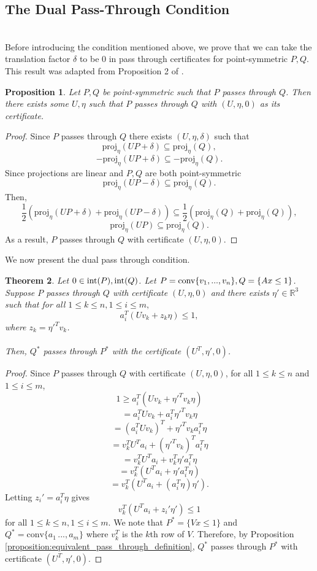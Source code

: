 \documentclass[a4paper]{amsart}
\newtheorem{thm}{Theorem}
\newtheorem{prop}[thm]{Proposition}
\theoremstyle{remark}
\begin{document}
\subsection{The Dual Pass-Through Condition} \label{subsec:dual_pass_through_condition}
\hfill \\
Before introducing the condition mentioned above, we prove that we can take the translation factor $\delta$ to be 0 in pass through certificates for point-symmetric $P,Q$. This result was adapted from Proposition 2 of \cite{StYu23}.

\begin{prop} \label{lem:translation_factor}
	Let $P,Q$ be point-symmetric such that $P$ passes through $Q$. Then there exists some $U, \eta$ such that $P$ passes through $Q$ with $(U, \eta, 0)$ as its certificate.
\end{prop}
\begin{proof}
	Since $P$ passes through $Q$ there exists $(U,\eta,\delta)$ such that
	$$\textrm{proj}_\eta(UP+\delta)\subseteq \textrm{proj}_\eta(Q),$$ 
	$$-\textrm{proj}_\eta (UP+\delta)\subseteq -\textrm{proj}_\eta(Q).$$ 
	Since projections are linear and $P,Q$ are both point-symmetric $$\textrm{proj}_\eta(UP-\delta)\subseteq \textrm{proj}_\eta(Q).$$
	Then, $$\frac{1}{2}\left(\textrm{proj}_\eta(UP+\delta)+\textrm{proj}_\eta(UP-\delta)\right)\subseteq\frac{1}{2}\left(\textrm{proj}_\eta(Q)+\textrm{proj}_\eta(Q)\right),$$$$\textrm{proj}_\eta(UP)\subseteq \textrm{proj}_\eta(Q).$$
	As a result, $P$ passes through $Q$ with certificate $(U, \eta, 0)$.
\end{proof}
\noindent
We now present the dual pass through condition.
\begin{thm} \label{thm:dual_pass_through_cond}
	Let $0\in \textup{int}(P),\textup{int}(Q)$. Let $P=\textup{conv}\{v_1,...,v_n\}, Q=\{Ax\leq 1\}$. Suppose $P$ passes through $Q$ with certificate $(U,\eta,0)$ and there exists $\eta'\in\mathbb{R}^3$ such that for all $1 \leq k \leq n, 1 \leq i \leq m,$
	$$a_i^T(Uv_k+z_k\eta)\leq 1,$$
	where $z_k = \eta'^Tv_k$.\\\\
	Then, $Q^*$ passes through $P^*$ with the certificate $(U^T,\eta',0)$.
\end{thm}
\begin{proof}
	Since $P$ passes through $Q$ with certificate $(U,\eta,0)$, for all $1\leq k\leq n$ and $1\leq i\leq m$,
	$$1\geq a_i^T(Uv_k+\eta'^Tv_k\eta)$$
	$$=a_i^TUv_k+a_i^T\eta'^Tv_k\eta$$
	$$=(a_i^TUv_k)^T+\eta'^Tv_ka_i^T\eta$$
	$$=v_k^TU^Ta_i+(\eta'^Tv_k)^Ta_i^T\eta$$
	$$=v_k^TU^Ta_i+v_k^T\eta'a_i^T\eta$$
	$$=v_k^T(U^Ta_i+\eta'a_i^T\eta)$$
	$$=v_k^T(U^Ta_i+(a_i^T\eta)\eta').$$
	Letting $z_i'=a_i^T\eta$ gives
	$$v_k^T(U^Ta_i+z_i'\eta')\leq 1$$
	for all $1 \leq k \leq n, 1 \leq i \leq m$. We note that $P^*=\{Vx\leq1\}$ and $Q^* = \textrm{conv}\{a_1\,...,a_m\}$ where $v_k^T$ is the $k$th row of $V$. Therefore, by Proposition \ref{proposition:equivalent_pass_through_definition}, $Q^*$ passes through $P^*$ with certificate $(U^T,\eta',0)$.
\end{proof}
\end{document}
